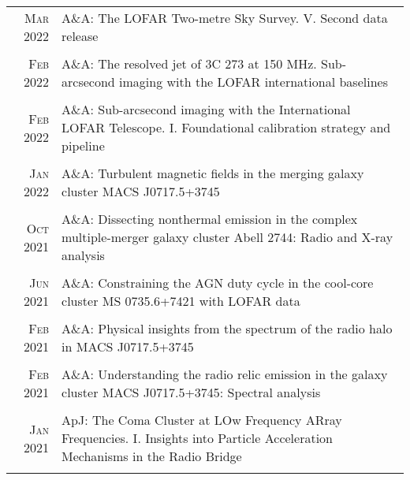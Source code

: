 \documentclass[11pt,a4paper,notitlepage]{article}
\begin{document}
\begin{tabular}{r|p{12.5cm}}

	\textsc{Mar 2022} & A\&A: The LOFAR Two-metre Sky Survey. V. Second data release \citep{2022AA...659A...1S} \\
	\multicolumn{2}{c}{} \\

	\textsc{Feb 2022} & A\&A: The resolved jet of 3C 273 at 150 MHz. Sub-arcsecond imaging with the LOFAR international baselines \citep{2022AA...658A...8H} \\
	\multicolumn{2}{c}{} \\

	\textsc{Feb 2022} & A\&A: Sub-arcsecond imaging with the International LOFAR Telescope. I. Foundational calibration strategy and pipeline \citep{2022AA...658A...1M} \\
	\multicolumn{2}{c}{} \\
	
	\textsc{Jan 2022} & A\&A: Turbulent magnetic fields in the merging galaxy cluster MACS J0717.5+3745 \citep{2022AA...657A...2R} \\
	\multicolumn{2}{c}{} \\

	\textsc{Oct 2021} & A\&A: Dissecting nonthermal emission in the complex multiple-merger galaxy cluster Abell 2744: Radio and X-ray analysis \citep{2021AA...654A..41R} \\
	\multicolumn{2}{c}{} \\
	
	\textsc{Jun 2021} & A\&A: Constraining the AGN duty cycle in the cool-core cluster MS 0735.6+7421 with LOFAR data
	 \citep{2021AA...650A.170B} \\
	\multicolumn{2}{c}{} \\


	\textsc{Feb 2021} & A\&A: Physical insights from the spectrum of the radio halo in MACS J0717.5+3745 \citep{2021AA...646A.135R} \\
	\multicolumn{2}{c}{} \\
	
	\textsc{Feb 2021} & A\&A: Understanding the radio relic emission in the galaxy cluster MACS J0717.5+3745: Spectral analysis \citep{2021AA...646A..56R} \\
	\multicolumn{2}{c}{} \\
	
	\textsc{Jan 2021} & ApJ: The Coma Cluster at LOw Frequency ARray Frequencies. I. Insights into Particle Acceleration Mechanisms in the Radio Bridge \citep{2021ApJ...907...32B} \\
	\multicolumn{2}{c}{} \\

\end{tabular}
\end{document}
